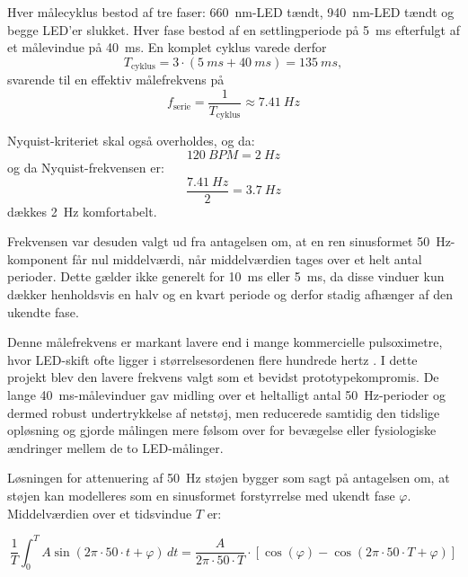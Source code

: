 Hver målecyklus bestod af tre faser: \SI{660}{nm}-LED tændt, \SI{940}{nm}-LED tændt og begge LED'er slukket. Hver fase bestod af en settlingperiode på \SI{5}{ms} efterfulgt af et målevindue på \SI{40}{ms}. En komplet cyklus varede derfor
\begin{equation}
    T_{\mathrm{cyklus}} = 3 \cdot (\SI{5}{ms}+\SI{40}{ms}) = \SI{135}{ms},
\end{equation}
svarende til en effektiv målefrekvens på
\begin{equation}
    f_{\mathrm{serie}} = \frac{1}{T_{\mathrm{cyklus}}} \approx \SI{7.41}{Hz}
\end{equation}

Nyquist-kriteriet skal også overholdes, og da:
\begin{equation}
    \SI{120}{BPM} = \SI{2}{Hz}
\end{equation}
og da Nyquist-frekvensen er:
\begin{equation}
    \frac{\SI{7.41}{Hz}}{2} = \SI{3.7}{Hz}
\end{equation}
dækkes \SI{2}{Hz} komfortabelt.

Frekvensen var desuden valgt ud fra antagelsen om, at en ren sinusformet \SI{50}{Hz}-komponent får nul middelværdi, når middelværdien tages over et helt antal perioder. Dette gælder ikke generelt for \SI{10}{ms} eller \SI{5}{ms}, da disse vinduer kun dækker henholdsvis en halv og en kvart periode og derfor stadig afhænger af den ukendte fase.

Denne målefrekvens er markant lavere end i mange kommercielle pulsoximetre, hvor LED-skift ofte ligger i størrelsesordenen flere hundrede hertz \cite[s.~61]{Webster1997}. I dette projekt blev den lavere frekvens valgt som et bevidst prototypekompromis. De lange \SI{40}{ms}-målevinduer gav midling over et heltalligt antal \SI{50}{Hz}-perioder og dermed robust undertrykkelse af netstøj, men reducerede samtidig den tidslige opløsning og gjorde målingen mere følsom over for bevægelse eller fysiologiske ændringer mellem de to LED-målinger.

Løsningen for attenuering af \SI{50}{Hz} støjen bygger som sagt på antagelsen om, at støjen kan modelleres som en sinusformet forstyrrelse med ukendt fase $\varphi$. Middelværdien over et tidsvindue $T$ er:

\begin{equation}
\label{eq:midling_50Hz_integral}
    \frac{1}{T} \int_0^T A \sin (2 \pi \cdot 50 \cdot t + \varphi)\, dt = \frac{A}{2\pi \cdot 50 \cdot T} \cdot \left[\cos(\varphi) - \cos(2\pi \cdot 50 \cdot T + \varphi)\right]
\end{equation}

